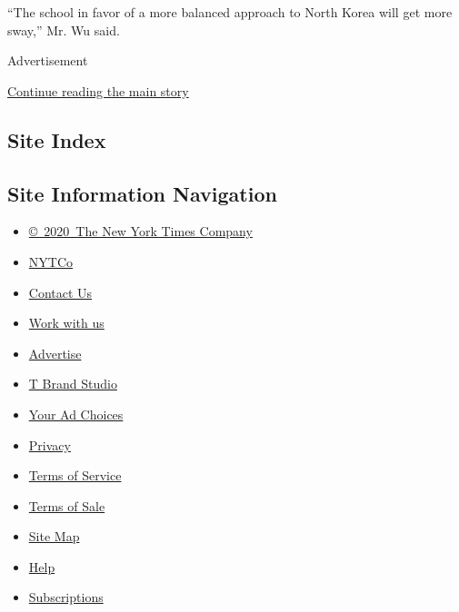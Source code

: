 ``The school in favor of a more balanced approach to North Korea will
get more sway,'' Mr. Wu said.

Advertisement

\protect\hyperlink{after-bottom}{Continue reading the main story}

\hypertarget{site-index}{%
\subsection{Site Index}\label{site-index}}

\hypertarget{site-information-navigation}{%
\subsection{Site Information
Navigation}\label{site-information-navigation}}

\begin{itemize}
\tightlist
\item
  \href{https://help.nytimes.com/hc/en-us/articles/115014792127-Copyright-notice}{©~2020~The
  New York Times Company}
\end{itemize}

\begin{itemize}
\tightlist
\item
  \href{https://www.nytco.com/}{NYTCo}
\item
  \href{https://help.nytimes.com/hc/en-us/articles/115015385887-Contact-Us}{Contact
  Us}
\item
  \href{https://www.nytco.com/careers/}{Work with us}
\item
  \href{https://nytmediakit.com/}{Advertise}
\item
  \href{http://www.tbrandstudio.com/}{T Brand Studio}
\item
  \href{https://www.nytimes.com/privacy/cookie-policy\#how-do-i-manage-trackers}{Your
  Ad Choices}
\item
  \href{https://www.nytimes.com/privacy}{Privacy}
\item
  \href{https://help.nytimes.com/hc/en-us/articles/115014893428-Terms-of-service}{Terms
  of Service}
\item
  \href{https://help.nytimes.com/hc/en-us/articles/115014893968-Terms-of-sale}{Terms
  of Sale}
\item
  \href{https://spiderbites.nytimes.com}{Site Map}
\item
  \href{https://help.nytimes.com/hc/en-us}{Help}
\item
  \href{https://www.nytimes.com/subscription?campaignId=37WXW}{Subscriptions}
\end{itemize}

